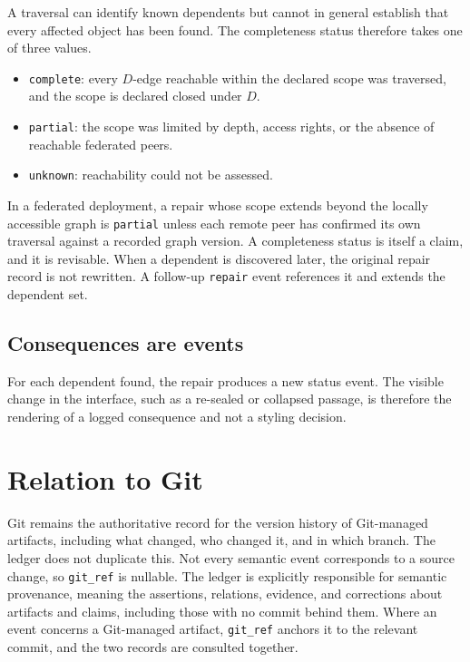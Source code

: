 \documentclass[11pt]{article}
\theoremstyle{definition}
\newcommand{\ev}[1]{\texttt{#1}}
\begin{document}
A traversal can identify known dependents but cannot in general establish that every affected object has been found. The completeness status therefore takes one of three values.

\begin{itemize}[leftmargin=1.5em]
\item \ev{complete}: every $D$-edge reachable within the declared scope was traversed, and the scope is declared closed under $D$.
\item \ev{partial}: the scope was limited by depth, access rights, or the absence of reachable federated peers.
\item \ev{unknown}: reachability could not be assessed.
\end{itemize}

In a federated deployment, a repair whose scope extends beyond the locally accessible graph is \ev{partial} unless each remote peer has confirmed its own traversal against a recorded graph version. A completeness status is itself a claim, and it is revisable. When a dependent is discovered later, the original repair record is not rewritten. A follow-up \ev{repair} event references it and extends the dependent set.

\subsection{Consequences are events}

For each dependent found, the repair produces a new status event. The visible change in the interface, such as a re-sealed or collapsed passage, is therefore the rendering of a logged consequence and not a styling decision.

\section{Relation to Git}

Git remains the authoritative record for the version history of Git-managed artifacts, including what changed, who changed it, and in which branch. The ledger does not duplicate this. Not every semantic event corresponds to a source change, so \ev{git\_ref} is nullable. The ledger is explicitly responsible for semantic provenance, meaning the assertions, relations, evidence, and corrections about artifacts and claims, including those with no commit behind them. Where an event concerns a Git-managed artifact, \ev{git\_ref} anchors it to the relevant commit, and the two records are consulted together.
\end{document}
